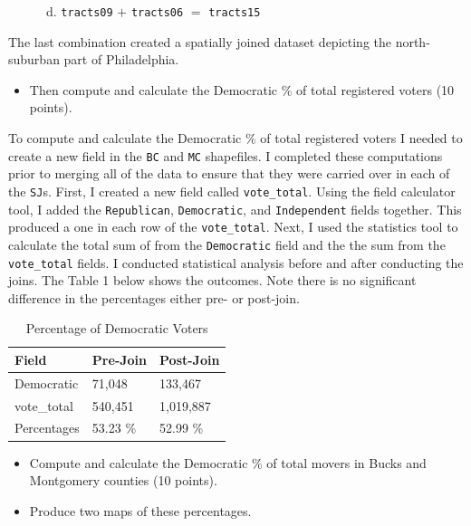 \documentclass[]{article}
\providecommand{\tightlist}{%
  \setlength{\itemsep}{0pt}\setlength{\parskip}{0pt}}
\begin{document}
~~~~~~d. \texttt{tracts09} \(+\) \texttt{tracts06} \(=\)
\texttt{tracts15}

The last combination created a spatially joined dataset depicting the
north-suburban part of Philadelphia.

\begin{itemize}
\tightlist
\item
  Then compute and calculate the Democratic \(\%\) of total registered
  voters (10 points).
\end{itemize}

To compute and calculate the Democratic \(\%\) of total registered
voters I needed to create a new field in the \texttt{BC} and \texttt{MC}
shapefiles. I completed these computations prior to merging all of the
data to ensure that they were carried over in each of the \texttt{SJ}s.
First, I created a new field called \texttt{vote\_total}. Using the
field calculator tool, I added the \texttt{Republican},
\texttt{Democratic}, and \texttt{Independent} fields together. This
produced a one in each row of the \texttt{vote\_total}. Next, I used the
statistics tool to calculate the total sum of from the
\texttt{Democratic} field and the the sum from the \texttt{vote\_total}
fields. I conducted statistical analysis before and after conducting the
joins. The Table 1 below shows the outcomes. Note there is no
significant difference in the percentages either pre- or post-join.

\begin{table}[]
\centering
\caption{Percentage of Democratic Voters}
\begin{tabular}{lll}
Field       & Pre-Join & Post-Join \\
\hline
Democratic  & 71,048   & 133,467   \\
vote\_total & 540,451  & 1,019,887 \\
\hline
\hline
Percentages & 53.23 \% & 52.99 \% 
\end{tabular}
\end{table}

\begin{itemize}
\item
  Compute and calculate the Democratic \(\%\) of total movers in Bucks
  and Montgomery counties (10 points).
\item
  Produce two maps of these percentages.
\end{itemize}
\end{document}
